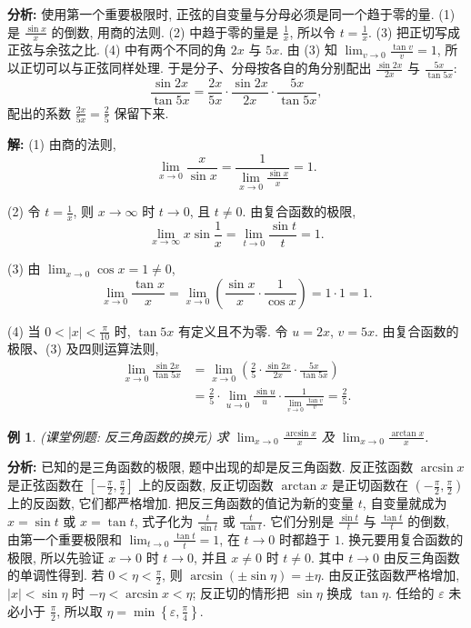 \documentclass[UTF8,openany]{ctexbook}
\theoremstyle{chinesetextbook}
\newtheorem{example}{例}[section]
\newenvironment{cnsolution}{\par\indent\textbf{解:} \ignorespaces}{\par}
\begin{document}
\par\indent\textbf{分析:} 使用第一个重要极限时, 正弦的自变量与分母必须是同一个趋于零的量. (1) 是 $\displaystyle\frac{\sin x}x$ 的倒数, 用商的法则. (2) 中趋于零的量是 $\displaystyle\frac1x$, 所以令 $\displaystyle t=\frac1x$. (3) 把正切写成正弦与余弦之比. (4) 中有两个不同的角 $2x$ 与 $5x$. 由 (3) 知 $\displaystyle\lim_{v\to0}\frac{\tan v}v=1$, 所以正切可以与正弦同样处理. 于是分子、分母按各自的角分别配出 $\displaystyle\frac{\sin2x}{2x}$ 与 $\displaystyle\frac{5x}{\tan5x}$:
\[
\frac{\sin2x}{\tan5x}=\frac{2x}{5x}\cdot\frac{\sin2x}{2x}\cdot\frac{5x}{\tan5x},
\]
配出的系数 $\displaystyle\frac{2x}{5x}=\frac25$ 保留下来.
\begin{cnsolution}
(1) 由商的法则,
\[
\lim_{x\to0}\frac x{\sin x}=\frac1{\displaystyle\lim_{x\to0}\frac{\sin x}x}=1.
\]

(2) 令 $\displaystyle t=\frac1x$, 则 $x\to\infty$ 时 $t\to0$, 且 $t\ne0$. 由复合函数的极限,
\[
\lim_{x\to\infty}x\sin\frac1x=\lim_{t\to0}\frac{\sin t}t=1.
\]

(3) 由 $\displaystyle\lim_{x\to0}\cos x=1\ne0$,
\[
\lim_{x\to0}\frac{\tan x}x=\lim_{x\to0}\left(\frac{\sin x}x\cdot\frac1{\cos x}\right)=1\cdot1=1.
\]

(4) 当 $\displaystyle0<|x|<\frac\pi{10}$ 时, $\tan5x$ 有定义且不为零. 令 $u=2x$, $v=5x$. 由复合函数的极限、(3) 及四则运算法则,
\[
\begin{aligned}
\lim_{x\to0}\frac{\sin2x}{\tan5x}
&=\lim_{x\to0}\left(\frac25\cdot\frac{\sin2x}{2x}\cdot\frac{5x}{\tan5x}\right)\\
&=\frac25\cdot\lim_{u\to0}\frac{\sin u}u\cdot\frac1{\displaystyle\lim_{v\to0}\frac{\tan v}v}=\frac25.
\end{aligned}
\]
\end{cnsolution}
\begin{example}
\textnormal{(课堂例题: 反三角函数的换元)} 求 $\displaystyle\lim_{x\to0}\frac{\arcsin x}x$ 及 $\displaystyle\lim_{x\to0}\frac{\arctan x}x$.
\end{example}
\par\indent\textbf{分析:} 已知的是三角函数的极限, 题中出现的却是反三角函数. 反正弦函数 $\arcsin x$ 是正弦函数在 $\displaystyle\left[-\frac\pi2,\frac\pi2\right]$ 上的反函数, 反正切函数 $\arctan x$ 是正切函数在 $\displaystyle\left(-\frac\pi2,\frac\pi2\right)$ 上的反函数, 它们都严格增加. 把反三角函数的值记为新的变量 $t$, 自变量就成为 $x=\sin t$ 或 $x=\tan t$, 式子化为 $\displaystyle\frac t{\sin t}$ 或 $\displaystyle\frac t{\tan t}$. 它们分别是 $\displaystyle\frac{\sin t}t$ 与 $\displaystyle\frac{\tan t}t$ 的倒数, 由第一个重要极限和 $\displaystyle\lim_{t\to0}\frac{\tan t}t=1$, 在 $t\to0$ 时都趋于 $1$. 换元要用复合函数的极限, 所以先验证 $x\to0$ 时 $t\to0$, 并且 $x\ne0$ 时 $t\ne0$. 其中 $t\to0$ 由反三角函数的单调性得到. 若 $\displaystyle0<\eta<\frac\pi2$, 则 $\arcsin(\pm\sin\eta)=\pm\eta$. 由反正弦函数严格增加, $|x|<\sin\eta$ 时 $-\eta<\arcsin x<\eta$; 反正切的情形把 $\sin\eta$ 换成 $\tan\eta$. 任给的 $\varepsilon$ 未必小于 $\displaystyle\frac\pi2$, 所以取 $\displaystyle\eta=\min\left\{\varepsilon,\frac\pi4\right\}$.
\end{document}
